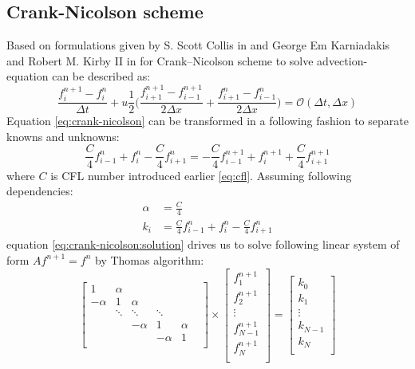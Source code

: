 \subsection{Crank-Nicolson scheme} \label{s:general-approach:crank-nicolson-analysis}
	Based on formulations given by S. Scott Collis in \cite{bib:introduction} and George Em Karniadakis and Robert M. Kirby II in \cite{bib:mpi} for Crank--Nicolson scheme to solve \gls{advection-equation} can be described as:
	\begin{equation} \label{eq:crank-nicolson}
		\frac{f_i^{n+1} - f_i^n}{\Delta t} +  u \frac{1}{2} \bigg(\frac{f_{i+1}^{n+1} - f_{i-1}^{n+1}}{2\Delta x} + \frac{f_{i+1}^{n} - f_{i-1}^n}{2\Delta x}\bigg)= \mathcal{O}(\Delta t, \Delta x)
	\end{equation}
	Equation \eqref{eq:crank-nicolson} can be transformed in a following fashion to separate knowns and unknowns:
	\begin{equation} \label{eq:crank-nicolson:solution}
		\frac{C}{4} f_{i-1}^n + f_{i}^n - \frac{C}{4} f_{i+1}^n = -\frac{C}{4} f_{i-1}^{n+1} + f_{i}^{n+1} + \frac{C}{4} f_{i+1}^{n+1}
	\end{equation}
	where $C$ is \gls{CFL} number introduced earlier \eqref{eq:cfl}. Assuming following dependencies:
	\begin{equation} \label{eq:crank-nicolson:dependencies-matrix}
		\begin{split}
			\alpha &= \frac{C}{4}\\
			 k_i &= \frac{C}{4} f_{i-1}^n + f_{i}^n - \frac{C}{4} f_{i+1}^n
		\end{split}
	\end{equation}
	equation \ref{eq:crank-nicolson:solution} drives us to solve following linear system of form $Af^{n+1} = f^n$ by Thomas algorithm:		
	\begin{equation} \label{eq:crani-nicolson:matrix}
		\begin{bmatrix}
			1 		& \alpha &		  &  	 &		&\\
			-\alpha & 1 	 & \alpha &  	 &		&\\ 
					& \ddots & \ddots &  \ddots	 &		&\\
					&		 &-\alpha & 1 	 &\alpha&\\
					& 		 & 		  &-\alpha&	1	&\\					
		\end{bmatrix} 
		\times
		\begin{bmatrix}
			f_1^{n+1} \\
			f_2^{n+1} \\
			\vdots	\\
			f_{N-1}^{n+1}\\
			f_{N}^{n+1}\\
		\end{bmatrix}
		=
		\begin{bmatrix}
			k_0 \\
			k_1 \\
			\vdots	\\
			k_{N-1} \\
			k_{N} \\
		\end{bmatrix}
	\end{equation}		
